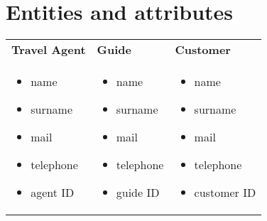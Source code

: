 \documentclass{article}
\begin{document}
\section{Entities and attributes}
    \bigskip
    \begin{tabular}{p{}p{}p{}}
        \textbf{Travel Agent} & \textbf{Guide} & \textbf{Customer}\\
        \begin{itemize}
            \item name
            \item surname
            \item mail
            \item telephone
            \item agent ID
        \end{itemize} & \begin{itemize}
            \item name
            \item surname
            \item mail
            \item telephone
            \item guide ID
        \end{itemize} & \begin{itemize}
            \item name
            \item surname
            \item mail
            \item telephone
            \item customer ID
        \end{itemize}\\
    \end{tabular}
\end{document}
